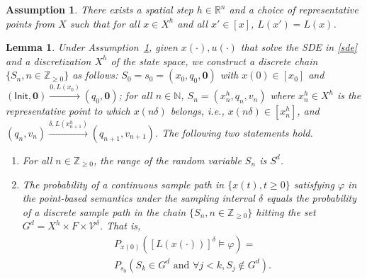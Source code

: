 \documentclass[letterpaper, 10 pt, conference]{ieeeconf}
\newtheorem{assumption}{Assumption}
\newtheorem{lemma}{Lemma}
\newcommand{\bbR}{\mathbb{R}}
\newcommand{\bbZ}{\mathbb{Z}_{\ge 0}}
\newcommand{\calV}{\mathcal{V}}
\newcommand{\init}{\mathsf{Init}}
\newcommand{\nat}{\mathbb{N}}
\begin{document}
\begin{assumption}
\label{assume:equivalent}
There exists a spatial step $h\in \bbR^n$ and a choice of
representative points from $X$ such that for all $x\in X^h$ and all
$x'\in [x]$, $L(x')=L(x)$. 
\end{assumption}
\begin{lemma}
  \label{lma1}Under Assumption~\ref{assume:equivalent}, given
  $x(\cdot), u (\cdot)$ that solve the SDE in \eqref{sde} and a
  discretization $X^h$ of the state space, we construct a discrete
  chain $\{S_n, n \in \bbZ\}$ as follows:
  $S_0 = s_0 =(x_0,q_0, \bm 0)$ with $x(0)\in [x_0]$ and
  $(\init, \bm 0) \xrightarrow{0,L(x_0)} (q_0, \bm 0)$; for all
  $n \in \nat$, $S_n = (x^h_n, q_n, v_n)$ where $x_n^h \in X^h$ is the
  representative point to which $x(n\delta)$ belongs, i.e.,
  $x(n\delta)\in [x_n^h]$, and
  $(q_n, v_n)\xrightarrow{\delta, L(x_{n+1}^h)} (q_{n+1}, v_{n+1})$.
  The following two statements hold.
\begin{enumerate}
\item For all $n \in\bbZ$, the range of the random variable $S_n$ is
  $S^d$.
\item The probability of a continuous sample path in
  $\{x(t), t\ge 0\}$ satisfying $\varphi$ in the point-based semantics
  under the sampling interval $\delta$ equals the probability of a
  discrete sample path in the chain $\{S_n, n \in \bbZ\}$ hitting the
  set $G^d = X^h\times F\times \calV^\delta$. That is,
\begin{multline*}
  P_{x(0)} \left( [L(x(\cdot))]^\delta\models \varphi  \right) =\\
  P_{s_0}(S_k \in G^d\text{ and } \forall  j<k, S_j \notin G^d).
\end{multline*}
\end{enumerate}
\end{lemma}
\end{document}
